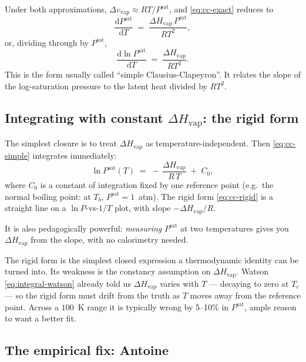 \documentclass[11pt,a4paper]{article}
\newcommand{\Hvap}{\Delta H_{\!\mathrm{vap}}}
\begin{document}
Under both approximations, $\Delta v_{\mathrm{vap}} \approx RT /
P^{\mathrm{sat}}$, and \eqref{eq:cc-exact} reduces to
\begin{equation}
   \frac{\mathrm{d}P^{\mathrm{sat}}}{\mathrm{d}T}
   \;=\; \frac{\Hvap\,P^{\mathrm{sat}}}{R T^{2}},
\end{equation}
or, dividing through by $P^{\mathrm{sat}}$,
\begin{equation}
   \boxed{\;
   \frac{\mathrm{d}\ln P^{\mathrm{sat}}}{\mathrm{d}T}
   \;=\; \frac{\Hvap}{R T^{2}}.
   \;}
   \label{eq:cc-simple}
\end{equation}
This is the form usually called ``simple Clausius-Clapeyron''.  It
relates the slope of the log-saturation pressure to the latent heat
divided by $RT^{2}$.

\subsection{Integrating with constant $\Hvap$: the rigid form}

The simplest closure is to treat $\Hvap$ as temperature-independent.
Then \eqref{eq:cc-simple} integrates immediately:
\begin{equation}
   \ln P^{\mathrm{sat}}(T) \;=\; -\,\frac{\Hvap}{R\,T} \;+\; C_0,
   \label{eq:cc-rigid}
\end{equation}
where $C_0$ is a constant of integration fixed by one reference point
(e.g.\ the normal boiling point: at $T_b$, $P^{\mathrm{sat}} = 1$~atm).
The rigid form \eqref{eq:cc-rigid} is a straight line on a
$\ln P$-vs-$1/T$ plot, with slope $-\Hvap/R$.

It is also pedagogically powerful: \emph{measuring} $P^{\mathrm{sat}}$
at two temperatures gives you $\Hvap$ from the slope, with no
calorimetry needed.

\begin{intuition}
The rigid form is the simplest closed expression a thermodynamic
identity can be turned into.  Its weakness is the constancy
assumption on $\Hvap$.  Watson \eqref{eq:integral-watson} already
told us $\Hvap$ varies with $T$ --- decaying to zero at $T_c$ ---
so the rigid form must drift from the truth as $T$ moves away from
the reference point.  Across a $100$~K range it is typically wrong
by 5--10\% in $P^{\mathrm{sat}}$, ample reason to want a better fit.
\end{intuition}

\subsection{The empirical fix: Antoine}
\end{document}
